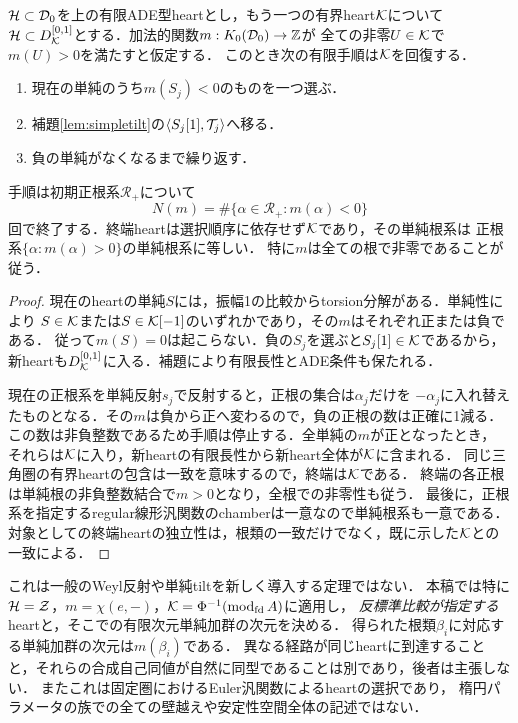 \begin{theorem}\label{thm:Eulerchamber}
$\mathcal H\subset\mathcal D_0$を上の有限ADE型heartとし，もう一つの有界heart$\mathcal K$について
$\mathcal H\subset D^{[0,1]}_{\mathcal K}$とする．加法的関数$m:K_0(\mathcal D_0)\to\mathbb Z$が
全ての非零$U\in\mathcal K$で$m(U)>0$を満たすと仮定する．
このとき次の有限手順は$\mathcal K$を回復する．
\begin{enumerate}
\item 現在の単純のうち$m(S_j)<0$のものを一つ選ぶ．
\item 補題\ref{lem:simpletilt}の$\langle S_j[1],\mathcal T_j\rangle$へ移る．
\item 負の単純がなくなるまで繰り返す．
\end{enumerate}
手順は初期正根系$\mathcal R_+$について
\[
 N(m)=\#\{\alpha\in\mathcal R_+:m(\alpha)<0\}
\]
回で終了する．終端heartは選択順序に依存せず$\mathcal K$であり，その単純根系は
正根系$\{\alpha:m(\alpha)>0\}$の単純根系に等しい．
特に$m$は全ての根で非零であることが従う．
\end{theorem}
\begin{proof}
現在のheartの単純$S$には，振幅1の比較からtorsion分解がある．単純性により
$S\in\mathcal K$または$S\in\mathcal K[-1]$のいずれかであり，その$m$はそれぞれ正または負である．
従って$m(S)=0$は起こらない．負の$S_j$を選ぶと$S_j[1]\in\mathcal K$であるから，
新heartも$D^{[0,1]}_{\mathcal K}$に入る．補題により有限長性とADE条件も保たれる．

現在の正根系を単純反射$s_j$で反射すると，正根の集合は$\alpha_j$だけを
$-\alpha_j$に入れ替えたものとなる．その$m$は負から正へ変わるので，負の正根の数は正確に1減る．
この数は非負整数であるため手順は停止する．全単純の$m$が正となったとき，
それらは$\mathcal K$に入り，新heartの有限長性から新heart全体が$\mathcal K$に含まれる．
同じ三角圏の有界heartの包含は一致を意味するので，終端は$\mathcal K$である．
終端の各正根は単純根の非負整数結合で$m>0$となり，全根での非零性も従う．
最後に，正根系を指定するregular線形汎関数のchamberは一意なので単純根系も一意である．
対象としての終端heartの独立性は，根類の一致だけでなく，既に示した$\mathcal K$との一致による．
\end{proof}
\begin{remark}
これは一般のWeyl反射や単純tiltを新しく導入する定理ではない．
本稿では特に$\mathcal H=\mathcal Z$，$m=\chi(e,-)$，$\mathcal K=\Phi^{-1}(\operatorname{mod}_{\rm fd}A)$に適用し，
\emph{反標準比較が指定する}heartと，そこでの有限次元単純加群の次元を決める．
得られた根類$\beta_i$に対応する単純加群の次元は$m(\beta_i)$である．
異なる経路が同じheartに到達することと，それらの合成自己同値が自然に同型であることは別であり，後者は主張しない．
またこれは固定圏におけるEuler汎関数によるheartの選択であり，
楕円パラメータの族での全ての壁越えや安定性空間全体の記述ではない．
\end{remark}

